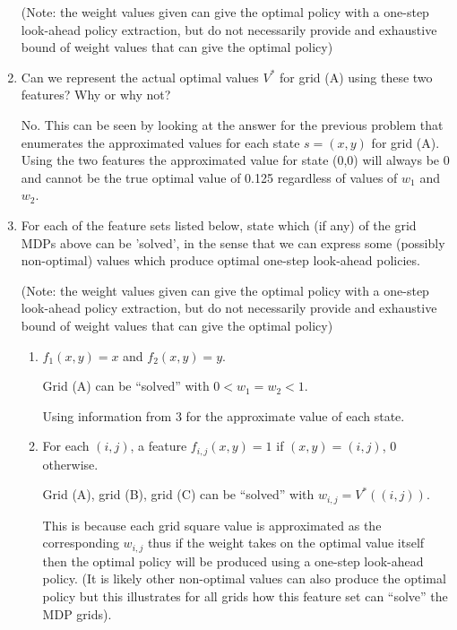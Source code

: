 \documentclass[12pt]{article}
\begin{document}
\begin{enumerate}
  (Note: the weight values given can give the optimal policy with a one-step look-ahead policy extraction, but do not necessarily provide and exhaustive bound of weight values that can give the optimal policy)


\item Can we represent the actual optimal values $V^*$ for grid (A)
  using these two features?  Why or why not?

  No. 
  This can be seen by looking at the answer for the previous problem that enumerates the approximated values for each state $s = (x, y)$ for grid (A).
  Using the two features the approximated value for state (0,0) will always be 0 and cannot be the true optimal value of 0.125 regardless of values of $w_1$ and $w_2$.

\clearpage

\item For each of the feature sets listed below, state which (if any)
  of the grid MDPs above can be 'solved', in the sense that we can
  express some (possibly non-optimal) values which produce optimal
  one-step look-ahead policies.

  (Note: the weight values given can give the optimal policy with a one-step look-ahead policy extraction, but do not necessarily provide and exhaustive bound of weight values that can give the optimal policy)

  \begin{enumerate}
  \item $f_1(x, y) = x$ and $f_2(x, y) = y$.

  Grid (A) can be ``solved'' with $ 0 < w_1 = w_2 < 1$. 

  Using information from 3 for the approximate value of each state.

  \item For each $(i, j)$, a feature $f_{i,j}(x, y) = 1$ if $(x, y) = (i, j)$, 0 otherwise.

  Grid (A), grid (B), grid (C) can be ``solved'' with $w_{i,j} = V^*((i,j))$.

  This is because each grid square value is approximated as the corresponding $w_{i,j}$ thus if the weight takes on the optimal value itself then the optimal policy will be produced using a one-step look-ahead policy. (It is likely other non-optimal values can also produce the optimal policy but this illustrates for all grids how this feature set can ``solve'' the MDP grids). %


\end{enumerate}
\end{enumerate}
\end{document}
